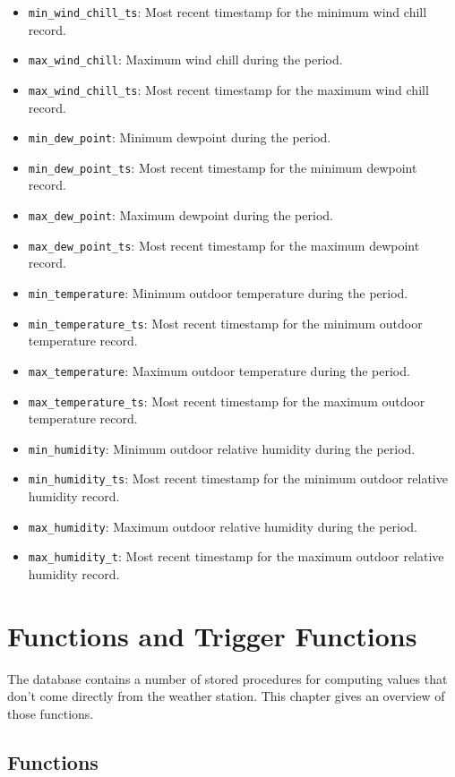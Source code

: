 \documentclass[a4paper,10pt]{book}
\begin{document}
\begin{itemize}
\item \verb|min_wind_chill_ts|: Most recent timestamp for the minimum wind chill record.
\item \verb|max_wind_chill|: Maximum wind chill during the period.
\item \verb|max_wind_chill_ts|: Most recent timestamp for the maximum wind chill record.
\item \verb|min_dew_point|: Minimum dewpoint during the period.
\item \verb|min_dew_point_ts|: Most recent timestamp for the minimum dewpoint record.
\item \verb|max_dew_point|: Maximum dewpoint during the period.
\item \verb|max_dew_point_ts|: Most recent timestamp for the maximum dewpoint record.
\item \verb|min_temperature|: Minimum outdoor temperature during the period.
\item \verb|min_temperature_ts|: Most recent timestamp for the minimum outdoor temperature record.
\item \verb|max_temperature|: Maximum outdoor temperature during the period.
\item \verb|max_temperature_ts|: Most recent timestamp for the maximum outdoor temperature record.
\item \verb|min_humidity|: Minimum outdoor relative humidity during the period.
\item \verb|min_humidity_ts|: Most recent timestamp for the minimum outdoor relative humidity record.
\item \verb|max_humidity|: Maximum outdoor relative humidity during the period.
\item \verb|max_humidity_t|: Most recent timestamp for the maximum outdoor relative humidity record.
\end{itemize}

\chapter{Functions and Trigger Functions}
\label{cha_functions}

The database contains a number of stored procedures for computing values that don't come directly from the weather station. This chapter gives an overview of those functions.

\section{Functions}
\label{functions}
\end{document}
